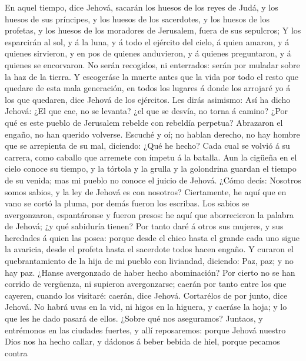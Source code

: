  En aquel tiempo, dice Jehová, sacarán los huesos de los
reyes de Judá, y los huesos de sus príncipes, y los huesos de los
sacerdotes, y los huesos de los profetas, y los huesos de los moradores
de Jerusalem, fuera de sus sepulcros;  Y los esparcirán al
sol, y á la luna, y á todo el ejército del cielo, á quien amaron, y á
quienes sirvieron, y en pos de quienes anduvieron, y á quienes
preguntaron, y á quienes se encorvaron. No serán recogidos, ni
enterrados: serán por muladar sobre la haz de la tierra. 
Y escogeráse la muerte antes que la vida por todo el resto que quedare
de esta mala generación, en todos los lugares á donde los arrojaré yo á
los que quedaren, dice Jehová de los ejércitos.  Les dirás
asimismo: Así ha dicho Jehová: ¿El que cae, no se levanta? ¿el que se
desvía, no torna á camino?  ¿Por qué es este pueblo de
Jerusalem rebelde con rebeldía perpetua? Abrazaron el engaño, no han
querido volverse.  Escuché y oí; no hablan derecho, no hay
hombre que se arrepienta de su mal, diciendo: ¿Qué he hecho? Cada cual
se volvió á su carrera, como caballo que arremete con ímpetu á la
batalla.  Aun la cigüeña en el cielo conoce su tiempo, y
la tórtola y la grulla y la golondrina guardan el tiempo de su venida;
mas mi pueblo no conoce el juicio de Jehová.  ¿Cómo decís:
Nosotros somos sabios, y la ley de Jehová es con nosotros? Ciertamente,
he aquí que en vano se cortó la pluma, por demás fueron los escribas.
 Los sabios se avergonzaron, espantáronse y fueron presos:
he aquí que aborrecieron la palabra de Jehová; ¿y qué sabiduría tienen?
 Por tanto daré á otros sus mujeres, y sus heredades á
quien las posea: porque desde el chico hasta el grande cada uno sigue la
avaricia, desde el profeta hasta el sacerdote todos hacen engaño.
 Y curaron el quebrantamiento de la hija de mi pueblo con
liviandad, diciendo: Paz, paz; y no hay paz.  ¿Hanse
avergonzado de haber hecho abominación? Por cierto no se han corrido de
vergüenza, ni supieron avergonzarse; caerán por tanto entre los que
cayeren, cuando los visitaré: caerán, dice Jehová. 
Cortarélos de por junto, dice Jehová. No habrá uvas en la vid, ni higos
en la higuera, y caeráse la hoja; y lo que les he dado pasará de ellos.
 ¿Sobre qué nos aseguramos? Juntaos, y entrémonos en las
ciudades fuertes, y allí reposaremos: porque Jehová nuestro Dios nos ha
hecho callar, y dádonos á beber bebida de hiel, porque pecamos contra
